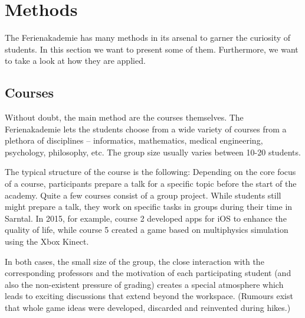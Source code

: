 \section{Methods}
The Ferienakademie has many methods in its arsenal to garner the curiosity of students. In this section we want to present some of them. Furthermore, we want to take a look at how they are applied.
\subsection{Courses}
Without doubt, the main method are the courses themselves. The Ferienakademie lets the students choose from a wide variety of courses from a plethora of disciplines -- informatics, mathematics, medical engineering, psychology, philosophy, etc. The group size usually varies between 10-20 students. 

The typical structure of the course is the following: Depending on the core focus of a course, participants prepare a talk for a specific topic before the start of the academy. Quite a few courses consist of a group project. While students still might prepare a talk, they work on specific tasks in groups during their time in Sarntal. In 2015, for example, course 2 developed apps for iOS to enhance the quality of life, while course 5 created a game based on multiphysics simulation using the Xbox Kinect. 

In both cases, the small size of the group, the close interaction with the corresponding professors and the motivation of each participating student (and also the non-existent pressure of grading) creates a special atmosphere which leads to exciting discussions that extend beyond the workspace. (Rumours exist that whole game ideas were developed, discarded and reinvented during hikes.) %

